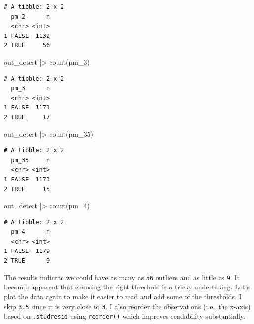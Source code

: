 \documentclass[
  letterpaper,
]{krantz}
\makeatletter
\newenvironment{Shaded}{\begin{snugshade}}{\end{snugshade}}
\newcommand{\FunctionTok}[1]{\textcolor[rgb]{0.28,0.35,0.67}{#1}}
\newcommand{\NormalTok}[1]{\textcolor[rgb]{0.00,0.23,0.31}{#1}}
\newcommand{\SpecialCharTok}[1]{\textcolor[rgb]{0.37,0.37,0.37}{#1}}
\newenvironment{kframe}{%
\medskip{}
\setlength{\fboxsep}{.8em}
 \def\at@end@of@kframe{}%
 \ifinner\ifhmode%
  \def\at@end@of@kframe{\end{minipage}}%
  \begin{minipage}{\columnwidth}%
 \fi\fi%
 \def\FrameCommand##1{\hskip\@totalleftmargin \hskip-\fboxsep
 \colorbox{shadecolor}{##1}\hskip-\fboxsep
     \hskip-\linewidth \hskip-\@totalleftmargin \hskip\columnwidth}%
 \MakeFramed {\advance\hsize-\width
   \@totalleftmargin\z@ \linewidth\hsize
   \@setminipage}}%
 {\par\unskip\endMakeFramed%
 \at@end@of@kframe}
\renewenvironment{Shaded}{\begin{kframe}}{\end{kframe}}
\makeatother
\begin{document}
\begin{verbatim}
# A tibble: 2 x 2
  pm_2      n
  <chr> <int>
1 FALSE  1132
2 TRUE     56
\end{verbatim}

\begin{Shaded}
\begin{Highlighting}[]
\NormalTok{out\_detect }\SpecialCharTok{|\textgreater{}} \FunctionTok{count}\NormalTok{(pm\_3)}
\end{Highlighting}
\end{Shaded}

\begin{verbatim}
# A tibble: 2 x 2
  pm_3      n
  <chr> <int>
1 FALSE  1171
2 TRUE     17
\end{verbatim}

\begin{Shaded}
\begin{Highlighting}[]
\NormalTok{out\_detect }\SpecialCharTok{|\textgreater{}} \FunctionTok{count}\NormalTok{(pm\_35)}
\end{Highlighting}
\end{Shaded}

\begin{verbatim}
# A tibble: 2 x 2
  pm_35     n
  <chr> <int>
1 FALSE  1173
2 TRUE     15
\end{verbatim}

\begin{Shaded}
\begin{Highlighting}[]
\NormalTok{out\_detect }\SpecialCharTok{|\textgreater{}} \FunctionTok{count}\NormalTok{(pm\_4)}
\end{Highlighting}
\end{Shaded}

\begin{verbatim}
# A tibble: 2 x 2
  pm_4      n
  <chr> <int>
1 FALSE  1179
2 TRUE      9
\end{verbatim}

The results indicate we could have as many as \texttt{56} outliers and
as little as \texttt{9}. It becomes apparent that choosing the right
threshold is a tricky undertaking. Let's plot the data again to make it
easier to read and add some of the thresholds. I skip \texttt{3.5} since
it is very close to \texttt{3}. I also reorder the observations
(i.e.~the x-axis) based on \texttt{.studresid} using \texttt{reorder()}
which improves readability substantially.
\end{document}

